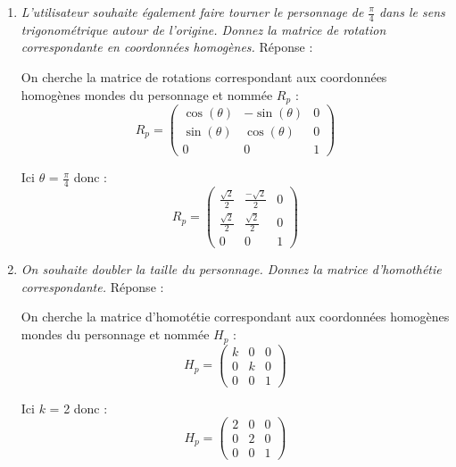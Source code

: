 \documentclass[a4paper,12pt]{article}
\begin{document}
\begin{enumerate}
    \item \emph{L'utilisateur souhaite également faire tourner le personnage de \(\frac{\pi}{4}\) dans le sens trigonométrique autour de l'origine. Donnez la matrice de rotation correspondante en coordonnées homogènes.} \label{exo:1.2}\newline \newline
Réponse :

On cherche la matrice de rotations correspondant aux coordonnées homogènes mondes du personnage et nommée $R_p$ : 
 \begin{equation}
R_p = 
\begin{pmatrix}
\cos(\theta) & -\sin(\theta) & 0 \\
\sin(\theta) & \cos(\theta) & 0 \\
0 & 0 & 1
\end{pmatrix} \end{equation}

Ici \(\theta\) = \(\frac{\pi}{4}\) donc : \newline
 \begin{equation}\boxed{
R_p = 
\begin{pmatrix}
\frac{\sqrt{2}}{2} & \frac{-\sqrt{2}}{2} & 0 \\
\frac{\sqrt{2}}{2} & \frac{\sqrt{2}}{2} & 0 \\
0 & 0 & 1
\end{pmatrix}} \end{equation} \newline
    \item \emph{On souhaite doubler la taille du personnage. Donnez la matrice d'homothétie correspondante.}\newline \newline
Réponse :

On cherche la matrice d'homotétie correspondant aux coordonnées homogènes mondes du personnage et nommée $H_p$ : 
 \begin{equation}
H_p = 
\begin{pmatrix}
k & 0 & 0 \\
0 & k & 0 \\
0 & 0 & 1
\end{pmatrix} \end{equation}

Ici $k$ = 2 donc : 
 \begin{equation}\boxed{
H_p = 
\begin{pmatrix}
2 & 0 & 0 \\
0 & 2 & 0 \\
0 & 0 & 1
\end{pmatrix}} \end{equation} \newline


\end{enumerate}
\end{document}
